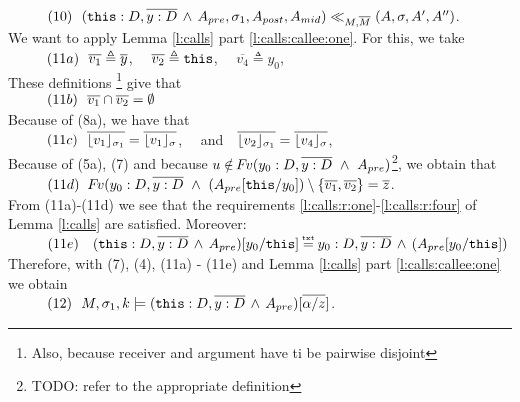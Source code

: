 \begin{description}
$\SPS (10) \ \ (\prg{this}:D,\overline{y:D}\, \wedge\, A_{pre},\sigma_1,A_{post}, A_{mid}) \ll_{M,\Mtwo} (A,\sigma,A', A'')$. 
\\
We want to apply Lemma   \ref{l:calls} part \ref{l:calls:callee:one}. For this, we take
\\
$\SPS (11a) \ \  \overline {v_1} \triangleq \overline y$, \ \ $\overline {v_2} \triangleq  \prg{this}$, \ \ $\overline {v_4} \triangleq  y_0$, 
\\
These definitions  \footnote{Also, because receiver and argument have ti be pairwise disjoint} give that 
\\
$\SPS (11b) \ \  \overline {v_1}\cap   \overline{v_2} = \emptyset $
\\
Because of (8a), we have that \\
$\SPS (11c) \ \ \overline {\interpret {\sigma_1} {v_1} } = \overline {\interpret {\sigma} {v_1} }$, \ \ and\ \  $\overline {\interpret {\sigma_1}  {v_2} } = \overline {\interpret {\sigma} {v_4} }$,\\
Because of (5a), (7)  and because $u\notin \fv(y_0:D ,\overline {y:D}\ \wedge \  A_{pre})$\footnote{TODO: refer to the appropriate definition}, we obtain that \\
$\SPS (11d) \ \ \fv(y_0:D ,\overline {y:D}\ \wedge \  (A_{pre}[\prg{this}/y_0]) \setminus \{ \overline {v_1}, \overline {v_2} \} =  \overline z$.    
\\
From   (11a)-(11d) we see that the requirements  \ref{l:calls:r:one}-\ref{l:calls:r:four} of Lemma \ref{l:calls}  are satisfied.  Moreover: \\
$\SPS (11e) \ \ \ (\prg{this}:D,\overline{y:D}\, \wedge\, A_{pre})[y_0/\prg{this}] \txteq  y_0:D,\overline{y:D}\, \wedge\, (A_{pre}[y_0/\prg{this}] )$\\
 Therefore, with (7), (4), (11a) - (11e) and  
 Lemma   \ref{l:calls} part \ref{l:calls:callee:one} we obtain\\
$\SPS (12) \ \  \satDAssertFrom M  {\sigma_1} {k}   {(\prg{this}:D,\overline{y:D}\, \wedge\, A_{pre})[\overline{\alpha/z}]}$.


\end{description}

